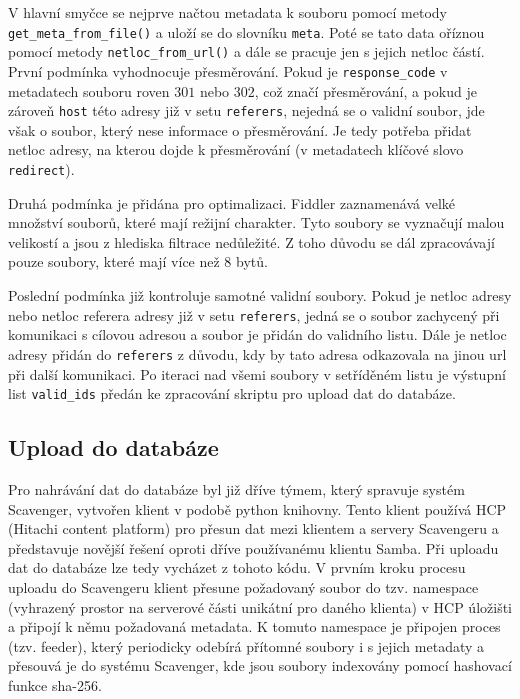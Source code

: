 \documentclass[thesis=M,czech,hidelinks]{FITthesis}[2013/05/06]
\begin{document}
V hlavní smyčce se nejprve načtou metadata k souboru pomocí metody \texttt{get_meta_from_file()} a uloží se do slovníku \texttt{meta}. Poté se tato data oříznou pomocí metody \texttt{netloc_from_url()} a dále se pracuje jen s jejich netloc částí. První podmínka vyhodnocuje přesměrování. Pokud je \texttt{response_code} v metadatech souboru roven $301$ nebo $302$, což značí přesměrování, a pokud je zároveň \texttt{host} této adresy již v setu \texttt{referers}, nejedná se o validní soubor, jde však o soubor, který nese informace o přesměrování. Je tedy potřeba přidat netloc adresy, na kterou dojde k přesměrování (v metadatech klíčové slovo \texttt{redirect}). 

Druhá podmínka je přidána pro optimalizaci. Fiddler zaznamenává velké množství souborů, které mají režijní charakter. Tyto soubory se vyznačují malou velikostí a jsou z hlediska filtrace nedůležité. Z toho důvodu se dál zpracovávají pouze soubory, které mají více než 8 bytů.

Poslední podmínka již kontroluje samotné validní soubory. Pokud je netloc adresy nebo netloc referera adresy již v setu \texttt{referers}, jedná se o soubor zachycený při komunikaci s cílovou adresou a soubor je přidán do validního listu. Dále je netloc adresy přidán do \texttt{referers} z důvodu, kdy by tato adresa odkazovala na jinou url při další komunikaci. Po iteraci nad všemi soubory v setříděném listu je výstupní list \texttt{valid_ids} předán ke zpracování skriptu pro upload dat do databáze.





\subsection{Upload do databáze} \label{sec:upload}
Pro nahrávání dat do databáze byl již dříve týmem, který spravuje systém Scavenger, vytvořen klient v podobě python knihovny. Tento klient používá HCP (Hitachi content platform) pro přesun dat mezi klientem a servery Scavengeru a představuje novější řešení oproti dříve používanému klientu Samba. Při uploadu dat do databáze lze tedy vycházet z tohoto kódu. V prvním kroku procesu uploadu do Scavengeru klient přesune požadovaný soubor do tzv. namespace (vyhrazený prostor na serverové části unikátní pro daného klienta) v HCP úložišti a připojí k němu požadovaná metadata. K tomuto namespace je připojen proces (tzv. feeder), který periodicky odebírá přítomné soubory i s jejich metadaty a přesouvá je do systému Scavenger, kde jsou soubory indexovány pomocí hashovací funkce sha-256.
\end{document}

